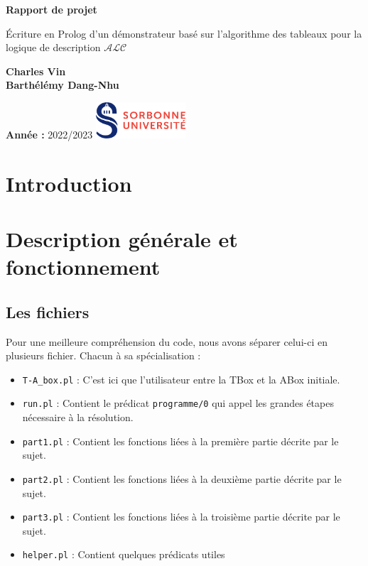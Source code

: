 \documentclass{article}
\begin{document}
\begin{titlepage}
    \begin{center}
        \vspace*{1cm}

        \Huge
        \textbf{Rapport de projet}

        \vspace{0.5cm}
        \LARGE
        Écriture en Prolog d'un démonstrateur basé sur l'algorithme des tableaux pour la logique de description  $ \mathcal{ALC}$

        \vspace{1.5cm}

        \textbf{Charles Vin}\\
        \textbf{Barthélémy Dang-Nhu}

        \vfill



        \normalsize

        \textbf{Année :}
        2022/2023
        \hfill
        \includegraphics[width=0.25\textwidth]{./src/logo.png}
    \end{center}
\end{titlepage}

\tableofcontents
\newpage
\section{Introduction}

\section{Description générale et fonctionnement}
\subsection{Les fichiers}
Pour une meilleure compréhension du code, nous avons séparer celui-ci en plusieurs fichier. Chacun à sa spécialisation : \begin{itemize}
    \item \verb|T-A_box.pl| : C'est ici que l'utilisateur entre la TBox et la ABox initiale.
    \item \verb|run.pl| : Contient le prédicat \verb|programme/0|  qui appel les grandes étapes nécessaire à la résolution.
    \item \verb|part1.pl| : Contient les fonctions liées à la première partie décrite par le sujet.
    \item \verb|part2.pl| : Contient les fonctions liées à la deuxième partie décrite par le sujet.
    \item \verb|part3.pl| : Contient les fonctions liées à la troisième partie décrite par le sujet.
    \item \verb|helper.pl| : Contient quelques prédicats utiles
\end{itemize}
\end{document}
